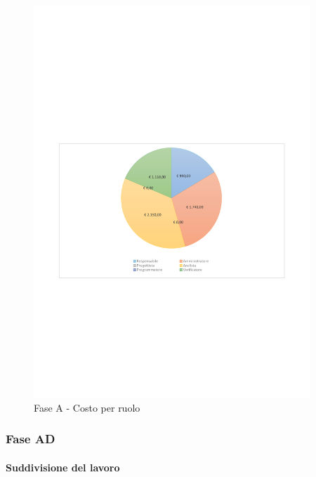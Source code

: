 \documentclass[../PianoProgetto.tex]{subfiles}
\begin{document}
	\begin{figure}[H]
		\centering
		\includegraphics[width=0.93\textwidth , trim=1.5cm 9cm 1.5cm 9cm]{grafici/A/A-costo}
			\caption{Fase A - Costo per ruolo}
		\label{fig:CircleChart-faseA_costo}
	\end{figure}
\vfill
	
	\subsubsection{Fase AD}
				\paragraph{Suddivisione del lavoro}\
				
\end{document}

